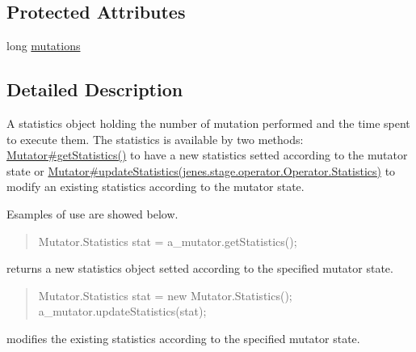 \subsection*{Protected Attributes}
\begin{DoxyCompactItemize}
\item 
long \hyperlink{classjenes_1_1stage_1_1operator_1_1_mutator_3_01_t_01extends_01_chromosome_01_4_1_1_statistics_a4328be89d9643f783f5c08164a0aa916}{mutations}
\end{DoxyCompactItemize}


\subsection{Detailed Description}
A statistics object holding the number of mutation performed and the time spent to execute them. The statistics is available by two methods\-: \hyperlink{}{Mutator\#get\-Statistics()} to have a new statistics setted according to the mutator state or \hyperlink{}{Mutator\#update\-Statistics(jenes.\-stage.\-operator.\-Operator.\-Statistics)} to modify an existing statistics according to the mutator state. 

Esamples of use are showed below. 

\begin{quotation}

\begin{DoxyPre}
Mutator.Statistics stat = a\_mutator.getStatistics();
\end{DoxyPre}
\end{quotation}


returns a new statistics object setted according to the specified mutator state. 

\begin{quotation}

\begin{DoxyPre}
Mutator.Statistics stat = new Mutator.Statistics();
a\_mutator.updateStatistics(stat);
\end{DoxyPre}
\end{quotation}


modifies the existing statistics according to the specified mutator state. 


